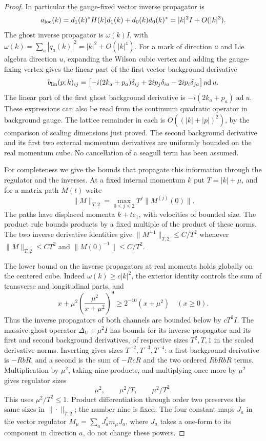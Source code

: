 \begin{proof}
In particular the gauge-fixed vector inverse propagator is
\[
 a_{\rm loc}(k)=d_1(k)^*H(k)d_1(k)+d_0(k)d_0(k)^*
              =|k|^2I+O(|k|^3).
\]
The ghost inverse propagator is $\omega(k)I$, with
$\omega(k)=\sum_a|q_a(k)|^2=|k|^2+O(|k|^4)$.
For a mark of direction $a$ and Lie algebra direction $u$, expanding the Wilson cubic
vertex and adding the gauge-fixing vertex gives the linear part of the first vector
background derivative
\[
 b_{\rm lin}(p;k)_{ij}
 =\bigl[-i(2k_a+p_a)\delta_{ij}
              +2ip_j\delta_{ia}-2ip_i\delta_{ja}\bigr]
                         \operatorname{ad}u.
\]
The linear part of the first ghost background derivative is $-i(2k_a+p_a)\operatorname{ad}u$.
These expressions can also be read from the continuum quadratic
operator in background gauge. The lattice remainder in each is
$O((|k|+|p|)^2)$, by the comparison of scaling dimensions just proved. The second
background derivative and its first two external momentum derivatives are uniformly
bounded on the real momentum cube. No cancellation of a seagull term
has been assumed.

For completeness we give the bounds that propagate this information
through the regulator and the inverses. At a fixed internal momentum
$k$ put $T=|k|+\mu$, and for a matrix path $M(t)$ write
\[
 \|M\|_{T,2}=\max_{0\le j\le2}T^j\|M^{(j)}(0)\|.
\]
The paths have displaced momenta $k+te_1$, with velocities of bounded
size. The product rule bounds products by a fixed multiple of the
product of these norms. The two inverse derivative identities give
$\|M^{-1}\|_{T,2}\le C/T^2$ whenever
$\|M\|_{T,2}\le CT^2$ and $\|M(0)^{-1}\|\le C/T^2$.

The lower bound on the inverse propagators at real momenta holds globally on the centered cube.
Indeed $\omega(k)\ge c|k|^2$, the exterior identity controls the sum of
transverse and longitudinal parts, and
\[
 x+\mu^2\left(\frac{\mu^2}{x+\mu^2}\right)^9
                    \ge2^{-10}(x+\mu^2)\quad(x\ge0).
\]
Thus the inverse propagators of both channels are bounded below by $cT^2I$.
The massive ghost operator $\Delta_U+\mu^2I$ has bounds for its inverse propagator and its
first and second background derivatives, of respective sizes
$T^2,T,1$ in the scaled derivative norms. Inverting gives sizes
$T^{-2},T^{-3},T^{-4}$: a first background derivative is $-R bR$, and a second
is the sum of $-RcR$ and the two ordered $RbRbR$ terms.
Multiplication by $\mu^2$, taking nine products, and multiplying once
more by $\mu^2$ gives regulator sizes
\begin{equation}\label{ch07:regulator-budgets}
 \mu^2,\qquad \mu^2/T,\qquad \mu^2/T^2.
\end{equation}
This uses $\mu^2/T^2\le1$. Product differentiation through order two
preserves the same sizes in $\|\cdot\|_{T,2}$; the number nine is fixed.
The four constant maps $J_a$ in the vector regulator $M_\mu=\sum_aJ_a^*m_\mu J_a$, where $J_a$ takes a one-form to its component in direction $a$, do not
change these powers.


\end{proof}
